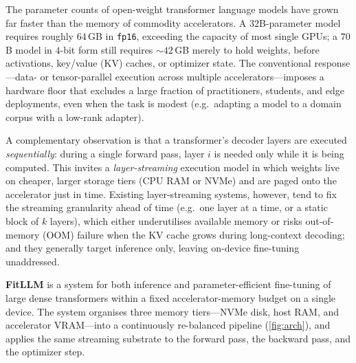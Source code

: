 \documentclass{article}
\begin{document}
The parameter counts of open-weight transformer language models have grown far
faster than the memory of commodity accelerators. A $32$B-parameter model
requires roughly $64$\,GB in \texttt{fp16}, exceeding the capacity of most
single GPUs; a $70$B model in $4$-bit form still requires $\sim$$42$\,GB merely
to hold weights, before activations, key/value (KV) caches, or optimizer state.
The conventional response---data- or tensor-parallel execution across multiple
accelerators---imposes a hardware floor that excludes a large fraction of
practitioners, students, and edge deployments, even when the task is modest
(e.g.\ adapting a model to a domain corpus with a low-rank adapter).

A complementary observation is that a transformer's decoder layers are executed
\emph{sequentially}: during a single forward pass, layer $i$ is needed only
while it is being computed. This invites a \emph{layer-streaming} execution
model in which weights live on cheaper, larger storage tiers (CPU RAM or NVMe)
and are paged onto the accelerator just in time. Existing layer-streaming
systems, however, tend to fix the streaming granularity ahead of time
(e.g.\ one layer at a time, or a static block of $k$ layers), which either
underutilises available memory or risks out-of-memory (OOM) failure when the KV
cache grows during long-context decoding; and they generally target inference
only, leaving on-device fine-tuning unaddressed.

\textbf{FitLLM} is a system for both inference and parameter-efficient
fine-tuning of large dense transformers within a fixed accelerator-memory
budget on a single device. The system organises three memory tiers---NVMe disk,
host RAM, and accelerator VRAM---into a continuously re-balanced pipeline
(\autoref{fig:arch}), and applies the same streaming substrate to the forward
pass, the backward pass, and the optimizer step.
\end{document}
